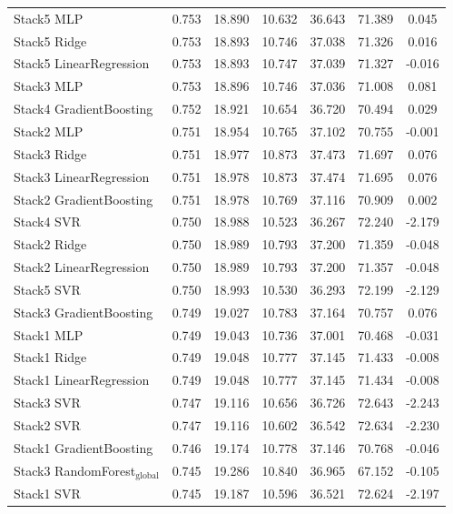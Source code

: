 \documentclass[a4paper,twocolumn]{article}
\begin{document}
\begin{table}
{\begin{tabular}{p{4.5cm}cccccc}
        Stack5 MLP & 0.753 & 18.890 & 10.632 & 36.643 & 71.389 & 0.045 \\
        Stack5 Ridge & 0.753 & 18.893 & 10.746 & 37.038 & 71.326 & 0.016 \\
        Stack5 LinearRegression & 0.753 & 18.893 & 10.747 & 37.039 & 71.327 & -0.016 \\
        Stack3 MLP & 0.753 & 18.896 & 10.746 & 37.036 & 71.008 & 0.081 \\
        Stack4 GradientBoosting & 0.752 & 18.921 & 10.654 & 36.720 & 70.494 & 0.029 \\
        Stack2 MLP & 0.751 & 18.954 & 10.765 & 37.102 & 70.755 & -0.001 \\
        Stack3 Ridge & 0.751 & 18.977 & 10.873 & 37.473 & 71.697 & 0.076 \\
        Stack3 LinearRegression & 0.751 & 18.978 & 10.873 & 37.474 & 71.695 & 0.076 \\
        Stack2 GradientBoosting & 0.751 & 18.978 & 10.769 & 37.116 & 70.909 & 0.002 \\
        Stack4 SVR & 0.750 & 18.988 & 10.523 & 36.267 & 72.240 & -2.179 \\
        Stack2 Ridge & 0.750 & 18.989 & 10.793 & 37.200 & 71.359 & -0.048 \\
        Stack2 LinearRegression & 0.750 & 18.989 & 10.793 & 37.200 & 71.357 & -0.048 \\
        Stack5 SVR & 0.750 & 18.993 & 10.530 & 36.293 & 72.199 & -2.129 \\
        Stack3 GradientBoosting & 0.749 & 19.027 & 10.783 & 37.164 & 70.757 & 0.076 \\
        Stack1 MLP & 0.749 & 19.043 & 10.736 & 37.001 & 70.468 & -0.031 \\
        Stack1 Ridge & 0.749 & 19.048 & 10.777 & 37.145 & 71.433 & -0.008 \\
        Stack1 LinearRegression & 0.749 & 19.048 & 10.777 & 37.145 & 71.434 & -0.008 \\
        Stack3 SVR & 0.747 & 19.116 & 10.656 & 36.726 & 72.643 & -2.243 \\
        Stack2 SVR & 0.747 & 19.116 & 10.602 & 36.542 & 72.634 & -2.230 \\
        Stack1 GradientBoosting & 0.746 & 19.174 & 10.778 & 37.146 & 70.768 & -0.046 \\
        Stack3 RandomForest$_{\text{global}}$ & 0.745 & 19.286 & 10.840 & 36.965 & 67.152 & -0.105 \\
        Stack1 SVR & 0.745 & 19.187 & 10.596 & 36.521 & 72.624 & -2.197 \\

\end{tabular}}
\end{table}
\end{document}
